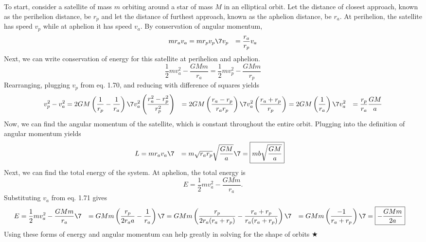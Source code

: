 \noindent To start, consider a satellite of mass $m$ orbiting around a star of mass $M$ in an elliptical orbit. Let the distance of closest approach, known as the perihelion distance, be $r_p$ and let the distance of furthest approach, known as the aphelion distance, be $r_a$. At perihelion, the satellite has speed $v_p$ while at aphelion it has speed $v_a$. By conservation of angular momentum,
\begin{align}
    mr_av_a &= mr_pv_p \7
    v_p &= \frac{r_a}{r_p}v_a
\end{align}
\noindent Next, we can write conservation of energy for this satellite at perihelion and aphelion.
\begin{equation*}
    \frac12 mv_a^2 -\frac{GMm}{r_a} = \frac12mv_p^2 - \frac{GMm}{r_p}
\end{equation*}
\noindent Rearranging, plugging $v_p$ from eq. 1.70, and reducing with difference of squares yields
\begin{align}
    v_p^2 - v_a^2 &= 2GM\left(\frac{1}{r_p} - \frac{1}{r_a}\right) \7
    v_a^2\left(\frac{r_a^2 -r_p^2}{r_p^2}\right) &= 2GM\left(\frac{r_a-r_p}{r_ar_p}\right) \7
    v_a^2\left(\frac{r_a +r_p}{r_p}\right) &= 2GM\left(\frac{1}{r_a}\right) \7
    v_a^2 &= \frac{r_p}{r_a} \frac{GM}{a}
\end{align}
\noindent Now, we can find the angular momentum of the satellite, which is constant throughout the entire orbit. Plugging into the definition of angular momentum yields
\begin{align}
    L &= mr_av_a \7
    &= m\sqrt{r_ar_p}\sqrt{\frac{GM}{a}} \7
    &= \boxed{mb\sqrt{\frac{GM}{a}}}
\end{align}
\noindent Next, we can find the total energy of the system. At aphelion, the total energy is 
\begin{equation*}
    E = \frac12 mv_a^2 -\frac{GMm}{r_a}.
\end{equation*}
\noindent Substituting $v_a$ from eq. 1.71 gives
\begin{align}
    E &= \frac12 mv_a^2 -\frac{GMm}{r_a} \7
    &= GMm\left(\frac{r_p}{2r_aa} - \frac{1}{r_a}\right) \7
    &= GMm\left(\frac{r_p}{2r_a(r_a + r_p)} - \frac{r_a+r_p}{r_a(r_a+r_p)}\right) \7
    &= GMm\left(\frac{-1}{r_a+r_p}\right) \7
    &= \boxed{-\frac{GMm}{2a}}
\end{align}
\noindent Using these forms of energy and angular momentum can help greatly in solving for the shape of orbits $\bigstar$

%
%
